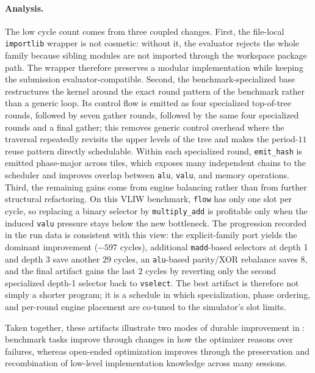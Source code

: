 \paragraph{Analysis.}
The low cycle count comes from three coupled changes. First, the file-local \texttt{importlib} wrapper is not cosmetic: without it, the evaluator rejects the whole family because sibling modules are not imported through the workspace package path. The wrapper therefore preserves a modular implementation while keeping the submission evaluator-compatible. Second, the benchmark-specialized base restructures the kernel around the exact round pattern of the benchmark rather than a generic loop. Its control flow is emitted as four specialized top-of-tree rounds, followed by seven gather rounds, followed by the same four specialized rounds and a final gather; this removes generic control overhead where the traversal repeatedly revisits the upper levels of the tree and makes the period-$11$ reuse pattern directly schedulable. Within each specialized round, \texttt{emit\_hash} is emitted phase-major across tiles, which exposes many independent chains to the scheduler and improves overlap between \texttt{alu}, \texttt{valu}, and memory operations. Third, the remaining gains come from engine balancing rather than from further structural refactoring. On this VLIW benchmark, \texttt{flow} has only one slot per cycle, so replacing a binary selector by \texttt{multiply\_add} is profitable only when the induced \texttt{valu} pressure stays below the new bottleneck. The progression recorded in the run data is consistent with this view: the explicit-family port yields the dominant improvement ($-597$ cycles), additional \texttt{madd}-based selectors at depth 1 and depth 3 save another $29$ cycles, an \texttt{alu}-based parity/XOR rebalance saves $8$, and the final artifact gains the last $2$ cycles by reverting only the second specialized depth-1 selector back to \texttt{vselect}. The best artifact is therefore not simply a shorter program; it is a schedule in which specialization, phase ordering, and per-round engine placement are co-tuned to the simulator's slot limits.

Taken together, these artifacts illustrate two modes of durable improvement in \ourmethod: benchmark tasks improve through changes in how the optimizer reasons over failures, whereas open-ended optimization improves through the preservation and recombination of low-level implementation knowledge across many sessions.
